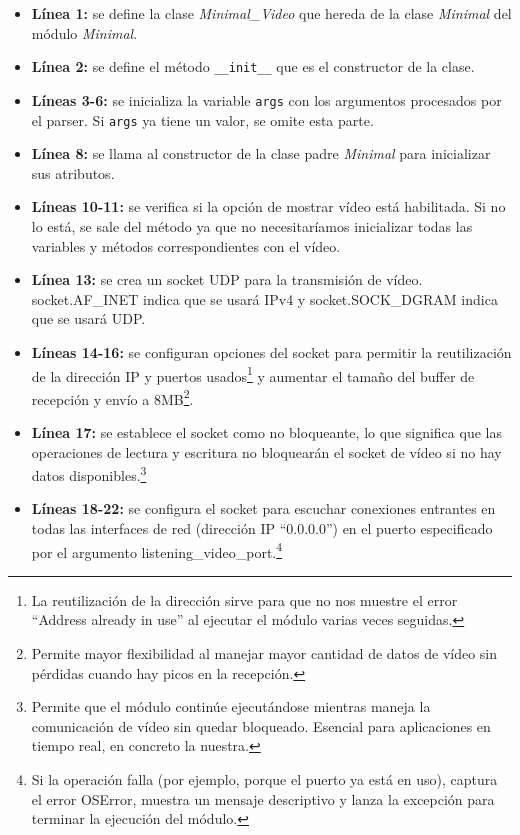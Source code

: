 \begin{itemize}
    \item \textbf{Línea 1:} se define la clase \textit{Minimal\_Video} que hereda de la clase \textit{Minimal} del módulo \textit{Minimal}.
    \item \textbf{Línea 2:} se define el método \texttt{\_\_init\_\_} que es el constructor de la clase.
    \item \textbf{Líneas 3-6:} se inicializa la variable \texttt{args} con los argumentos procesados por el parser. Si \texttt{args} ya tiene un valor, se omite esta parte.
    \item \textbf{Línea 8:} se llama al constructor de la clase padre \textit{Minimal} para inicializar sus atributos.
    \item \textbf{Líneas 10-11:} se verifica si la opción de mostrar vídeo está habilitada. Si no lo está, se sale del método ya que no necesitaríamos inicializar todas las variables y métodos correspondientes con el vídeo.
    \item \textbf{Línea 13:} se crea un socket UDP para la transmisión de vídeo. socket.AF\_INET indica que se usará IPv4 y socket.SOCK\_DGRAM indica que se usará UDP.
    \item \textbf{Líneas 14-16:} se configuran opciones del socket para permitir la reutilización de la dirección IP y puertos usados\footnote{La reutilización de la dirección sirve para que no nos muestre el error ``Address already in use'' al ejecutar el módulo varias veces seguidas.} y aumentar el tamaño del buffer de recepción y envío a 8MB\footnote{Permite mayor flexibilidad al manejar mayor cantidad de datos de vídeo sin pérdidas cuando hay picos en la recepción.}.
    \item \textbf{Línea 17:} se establece el socket como no bloqueante, lo que significa que las operaciones de lectura y escritura no bloquearán el socket de vídeo si no hay datos disponibles.\footnote{Permite que el módulo continúe ejecutándose mientras maneja la comunicación de vídeo sin quedar bloqueado. Esencial para aplicaciones en tiempo real, en concreto la nuestra.}
    \item \textbf{Líneas 18-22:} se configura el socket para escuchar conexiones entrantes en todas las interfaces de red (dirección IP ``0.0.0.0'') en el puerto especificado por el argumento listening\_video\_port.\footnote{ Si la operación falla (por ejemplo, porque el puerto ya está en uso), captura el error OSError, muestra un mensaje descriptivo y lanza la excepción para terminar la ejecución del módulo.}

\end{itemize}
